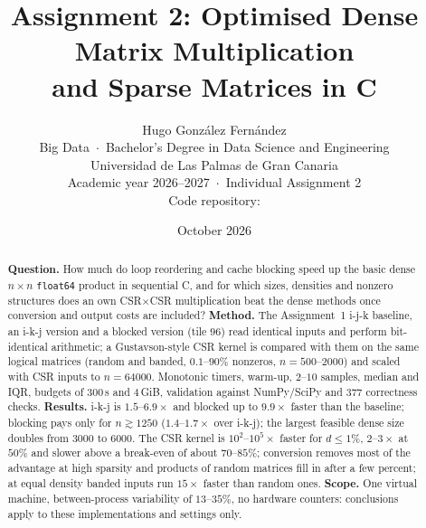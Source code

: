 \documentclass[10pt,a4paper]{article}
\title{\textbf{Assignment 2: Optimised Dense Matrix Multiplication\\and Sparse Matrices in C}}
\author{Hugo Gonz\'alez Fern\'andez\\[2pt]
Big Data \,$\cdot$\, Bachelor’s Degree in Data Science and Engineering\\
Universidad de Las Palmas de Gran Canaria\\
Academic year 2026--2027 \,$\cdot$\, Individual Assignment 2\\[2pt]
Code repository: \repourl}
\date{October 2026}
\begin{document}
\maketitle

\begin{abstract}
\noindent\textbf{Question.} How much do loop reordering and cache blocking speed up the basic dense $n\times n$ \texttt{float64} product in sequential C, and for which sizes, densities and nonzero structures does an own CSR$\times$CSR
multiplication beat the dense methods once conversion and output costs are included? \textbf{Method.} The Assignment~1 i-j-k baseline, an i-k-j version and a blocked version (tile $96$) read identical inputs and perform bit-identical arithmetic; a Gustavson-style CSR kernel is compared with them on the same logical matrices
(random and banded, $0.1$--$90\%$ nonzeros, $n=500$--$2000$) and scaled with CSR inputs to $n=64000$. Monotonic timers, warm-up, $2$--$10$ samples, median and IQR, budgets of $300$\,s and $4$\,GiB, validation against NumPy/SciPy and $377$ correctness checks.
\textbf{Results.} i-k-j is $1.5$--$6.9\times$ and blocked up to $9.9\times$ faster than the baseline; blocking pays only for $n\gtrsim1250$ ($1.4$--$1.7\times$ over i-k-j); the largest feasible dense size doubles from $3000$ to $6000$. The CSR kernel is $10^2$--$10^5\times$ faster for $d\le1\%$, $2$--$3\times$ at $50\%$ and slower
above a break-even of about $70$--$85\%$; conversion removes most of the advantage at high sparsity and products of random matrices fill in after a few percent; at equal density banded inputs run $15\times$ faster than random ones. \textbf{Scope.} One virtual machine, between-process variability of $13$--$35\%$, no hardware counters: conclusions apply to these implementations and settings only.
\end{abstract}




\end{document}
